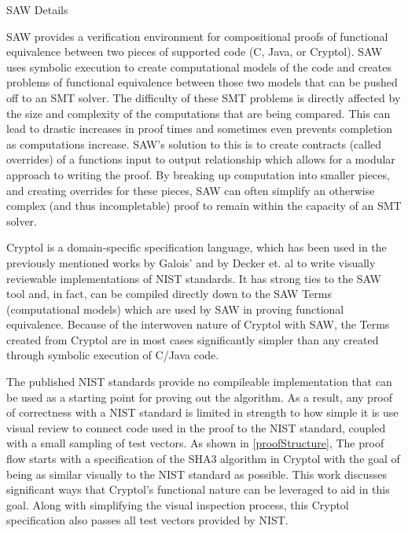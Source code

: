 SAW Details


SAW provides a verification environment for compositional proofs of functional equivalence between two pieces of supported code (C, Java, or Cryptol).
SAW uses symbolic execution to create computational models of the code and creates problems of functional equivalence between those two models that can be pushed off to an SMT solver.  
The difficulty of these SMT problems is directly affected by the size and complexity of the computations that are being compared.
This can lead to drastic increases in proof times and sometimes even prevents completion as computations increase.  
SAW's solution to this is to create contracts (called overrides) of a functions input to output relationship which allows for a modular approach to writing the proof.
By breaking up computation into smaller pieces, and creating overrides for these pieces, SAW can often simplify an otherwise complex (and thus incompletable) proof to remain within the capacity of an SMT solver.

Cryptol is a domain-specific specification language, which has been used in the previously mentioned works by Galois' and by Decker et. al to write visually reviewable implementations of NIST standards.
It has strong ties to the SAW tool and, in fact, can be compiled directly down to the SAW Terms (computational models) which are used by SAW in proving functional equivalence.
Because of the interwoven nature of Cryptol with SAW, the Terms created from Cryptol are in most cases significantly simpler than any created through symbolic execution of C/Java code.

The published NIST standards provide no compileable implementation that can be used as a starting point for proving out the algorithm.
As a result, any proof of correctness with a NIST standard is limited in strength to how simple it is use visual review to connect code used in the proof to the NIST standard, coupled with a small sampling of test vectors.
As shown in \ref{proofStructure}, The proof flow starts with a specification of the SHA3 algorithm in Cryptol with the goal of being as similar visually to the NIST standard as possible.
This work discusses significant ways that Cryptol's functional nature can be leveraged to aid in this goal.
Along with simplifying the visual inspection process, this Cryptol specification also passes all test vectors provided by NIST.

